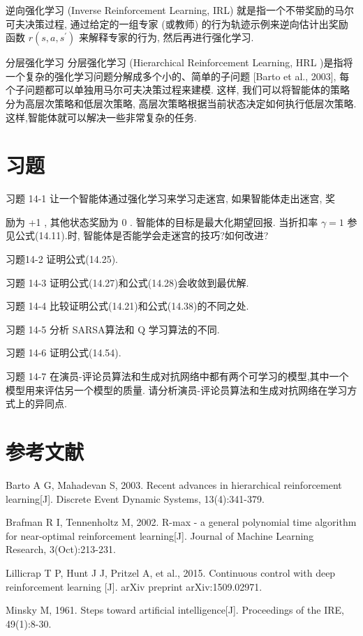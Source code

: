 \documentclass[10pt]{article}
\begin{document}
逆向强化学习 (Inverse Reinforcement Learning, IRL) 就是指一个不带奖励的马尔可夫决策过程, 通过给定的一组专家 (或教师) 的行为轨迹示例来逆向估计出奖励函数 $r\left(s, a, s^{\prime}\right)$ 来解释专家的行为, 然后再进行强化学习.

分层强化学习 分层强化学习 (Hierarchical Reinforcement Learning, HRL )是指将一个复杂的强化学习问题分解成多个小的、简单的子问题 [Barto et al., 2003], 每个子问题都可以单独用马尔可夫决策过程来建模. 这样, 我们可以将智能体的策略分为高层次策略和低层次策略, 高层次策略根据当前状态决定如何执行低层次策略. 这样,智能体就可以解决一些非常复杂的任务.

\section*{习题}
习题 14-1 让一个智能体通过强化学习来学习走迷宫, 如果智能体走出迷宫, 奖

励为 +1 , 其他状态奖励为 0 . 智能体的目标是最大化期望回报. 当折扣率 $\gamma=1$ 参见公式(14.11).时, 智能体是否能学会走迷宫的技巧?如何改进?

习题14-2 证明公式(14.25).

习题 14-3 证明公式(14.27)和公式(14.28)会收敛到最优解.

习题 14-4 比较证明公式(14.21)和公式(14.38)的不同之处.

习题 14-5 分析 SARSA算法和 Q 学习算法的不同.

习题 14-6 证明公式(14.54).

习题 14-7 在演员-评论员算法和生成对抗网络中都有两个可学习的模型,其中一个模型用来评估另一个模型的质量. 请分析演员-评论员算法和生成对抗网络在学习方式上的异同点.

\section*{参考文献}
Barto A G, Mahadevan S, 2003. Recent advances in hierarchical reinforcement learning[J]. Discrete Event Dynamic Systems, 13(4):341-379.

Brafman R I, Tennenholtz M, 2002. R-max - a general polynomial time algorithm for near-optimal reinforcement learning[J]. Journal of Machine Learning Research, 3(Oct):213-231.

Lillicrap T P, Hunt J J, Pritzel A, et al., 2015. Continuous control with deep reinforcement learning [J]. arXiv preprint arXiv:1509.02971.

Minsky M, 1961. Steps toward artificial intelligence[J]. Proceedings of the IRE, 49(1):8-30.
\end{document}
